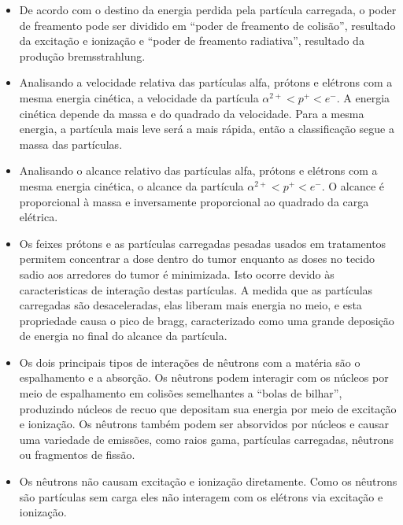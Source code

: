 \documentclass[11pt,a4paper]{article}
\newcounter{exemplo}
\begin{document}
\begin{exemplo}
\begin{itemize}
        \item De acordo com o destino da energia perdida pela partícula carregada, o poder de freamento pode ser dividido em “poder de freamento de colisão”, resultado da excitação e ionização e “poder de freamento radiativa”, resultado da produção bremsstrahlung.
        
        \item Analisando a velocidade relativa das partículas alfa, prótons e elétrons com a mesma energia cinética, a velocidade da partícula $\alpha^{2+} < p^{+} < e^{-}$. A energia cinética depende da massa e do quadrado da velocidade. Para a mesma energia, a partícula mais leve será a mais rápida, então a classificação segue a massa das partículas.
        
        \item Analisando o alcance relativo das partículas alfa, prótons e elétrons com a mesma energia cinética, o alcance da partícula $\alpha^{2+} < p^{+} < e^{-}$. O alcance é proporcional à massa e inversamente proporcional ao quadrado da carga elétrica.
        
        \item Os feixes prótons e as partículas carregadas pesadas usados em tratamentos permitem concentrar a dose dentro do tumor enquanto as doses no tecido sadio aos arredores do tumor é minimizada. Isto ocorre devido às caracteristicas de interação destas partículas. A medida que as partículas carregadas são desaceleradas, elas liberam mais energia no meio, e esta propriedade causa o pico de bragg, caracterizado como uma grande deposição de energia no final do alcance da partícula. 
        
        \item Os dois principais tipos de interações de nêutrons com a matéria são o espalhamento e a absorção. Os nêutrons podem interagir com os núcleos por meio de espalhamento em colisões semelhantes a “bolas de bilhar”, produzindo núcleos de recuo que depositam sua energia por meio de excitação e ionização. Os nêutrons também podem ser absorvidos por núcleos e causar uma variedade de emissões, como raios gama, partículas carregadas, nêutrons ou fragmentos de fissão.
        
        \item Os nêutrons não causam excitação e ionização diretamente. Como os nêutrons são partículas sem carga eles não interagem com os elétrons via excitação e ionização.
        

\end{itemize}
\end{exemplo}
\end{document}
